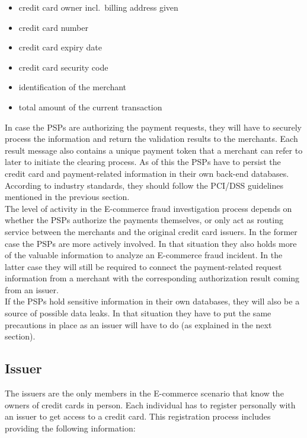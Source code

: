 \begin{itemize}
		\item credit card owner incl.\ billing address given
		\item credit card number
		\item credit card expiry date
		\item credit card security code
		\item identification of the merchant
		\item total amount of the current transaction
\end{itemize}

In case the \gls{PSP}s are authorizing the payment requests, they will have to securely process the information and return the validation results to the merchants. Each result message also contains a unique payment token that a merchant can refer to later to initiate the clearing process. As of this the \gls{PSP}s have to persist the credit card and payment-related information in their own back-end databases. According to industry standards, they should follow the \gls{PCI/DSS} guidelines mentioned in the previous section. \\

The level of activity in the \gls{E-commerce} fraud investigation process depends on whether the \gls{PSP}s authorize the payments themselves, or only act as routing service between the merchants and the original credit card issuers. In the former case the \gls{PSP}s are more actively involved. In that situation they also holds more of the valuable information to analyze an \gls{E-commerce} fraud incident. In the latter case they will still be required to connect the payment-related request information from a merchant with the corresponding authorization result coming from an issuer. \\

If the \gls{PSP}s hold sensitive information in their own databases, they will also be a source of possible data leaks. In that situation they have to put the same precautions in place as an issuer will have to do (as explained in the next section).


\subsection{Issuer}
\label{subsec:stakeholder_issuer}

The issuers are the only members in the \gls{E-commerce} scenario that know the owners of credit cards in person. Each individual has to register personally with an issuer to get access to a credit card. This registration process includes providing the following information: \@

